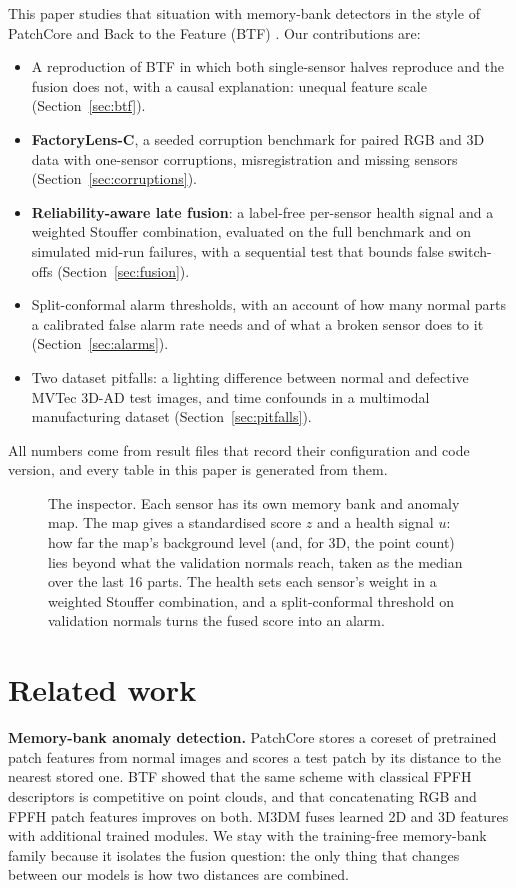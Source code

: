 \documentclass[10pt,twocolumn,letterpaper]{article}
\begin{document}
This paper studies that situation with memory-bank detectors in the style of PatchCore \citep{roth2022patchcore} and Back to the Feature (BTF) \citep{horwitz2023btf}. Our contributions are:
\begin{itemize}\itemsep0pt
\item A reproduction of BTF in which both single-sensor halves reproduce and the fusion does not, with a causal explanation: unequal feature scale (Section~\ref{sec:btf}).
\item \textbf{FactoryLens-C}, a seeded corruption benchmark for paired RGB and 3D data with one-sensor corruptions, misregistration and missing sensors (Section~\ref{sec:corruptions}).
\item \textbf{Reliability-aware late fusion}: a label-free per-sensor health signal and a weighted Stouffer combination, evaluated on the full benchmark and on simulated mid-run failures, with a sequential test that bounds false switch-offs (Section~\ref{sec:fusion}).
\item Split-conformal alarm thresholds, with an account of how many normal parts a calibrated false alarm rate needs and of what a broken sensor does to it (Section~\ref{sec:alarms}).
\item Two dataset pitfalls: a lighting difference between normal and defective MVTec 3D-AD test images, and time confounds in a multimodal manufacturing dataset (Section~\ref{sec:pitfalls}).
\end{itemize}
All numbers come from result files that record their configuration and code version, and every table in this paper is generated from them.

\begin{figure}[t]
\centering

\caption{The inspector. Each sensor has its own memory bank and anomaly map. The map gives a standardised score $z$ and a health signal $u$: how far the map's background level (and, for 3D, the point count) lies beyond what the validation normals reach, taken as the median over the last 16 parts. The health sets each sensor's weight in a weighted Stouffer combination, and a split-conformal threshold on validation normals turns the fused score into an alarm.}
\label{fig:overview}
\end{figure}

\section{Related work}

\textbf{Memory-bank anomaly detection.} PatchCore \citep{roth2022patchcore} stores a coreset of pretrained patch features from normal images and scores a test patch by its distance to the nearest stored one. BTF \citep{horwitz2023btf} showed that the same scheme with classical FPFH descriptors \citep{rusu2009fpfh} is competitive on point clouds, and that concatenating RGB and FPFH patch features improves on both. M3DM \citep{wang2023m3dm} fuses learned 2D and 3D features with additional trained modules. We stay with the training-free memory-bank family because it isolates the fusion question: the only thing that changes between our models is how two distances are combined.
\end{document}
